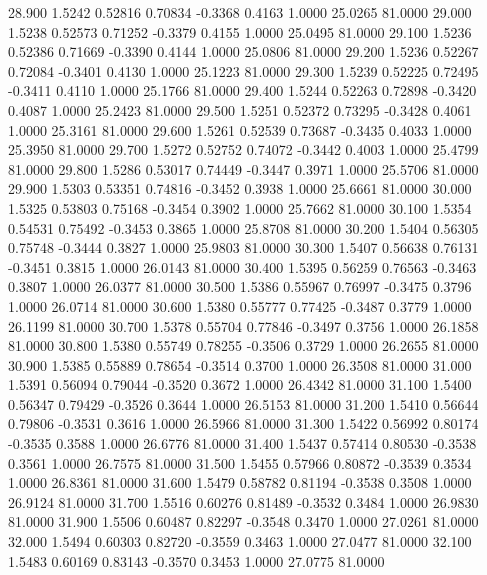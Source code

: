   28.900   1.5242   0.52816   0.70834  -0.3368   0.4163   1.0000  25.0265  81.0000
  29.000   1.5238   0.52573   0.71252  -0.3379   0.4155   1.0000  25.0495  81.0000
  29.100   1.5236   0.52386   0.71669  -0.3390   0.4144   1.0000  25.0806  81.0000
  29.200   1.5236   0.52267   0.72084  -0.3401   0.4130   1.0000  25.1223  81.0000
  29.300   1.5239   0.52225   0.72495  -0.3411   0.4110   1.0000  25.1766  81.0000
  29.400   1.5244   0.52263   0.72898  -0.3420   0.4087   1.0000  25.2423  81.0000
  29.500   1.5251   0.52372   0.73295  -0.3428   0.4061   1.0000  25.3161  81.0000
  29.600   1.5261   0.52539   0.73687  -0.3435   0.4033   1.0000  25.3950  81.0000
  29.700   1.5272   0.52752   0.74072  -0.3442   0.4003   1.0000  25.4799  81.0000
  29.800   1.5286   0.53017   0.74449  -0.3447   0.3971   1.0000  25.5706  81.0000
  29.900   1.5303   0.53351   0.74816  -0.3452   0.3938   1.0000  25.6661  81.0000
  30.000   1.5325   0.53803   0.75168  -0.3454   0.3902   1.0000  25.7662  81.0000
  30.100   1.5354   0.54531   0.75492  -0.3453   0.3865   1.0000  25.8708  81.0000
  30.200   1.5404   0.56305   0.75748  -0.3444   0.3827   1.0000  25.9803  81.0000
  30.300   1.5407   0.56638   0.76131  -0.3451   0.3815   1.0000  26.0143  81.0000
  30.400   1.5395   0.56259   0.76563  -0.3463   0.3807   1.0000  26.0377  81.0000
  30.500   1.5386   0.55967   0.76997  -0.3475   0.3796   1.0000  26.0714  81.0000
  30.600   1.5380   0.55777   0.77425  -0.3487   0.3779   1.0000  26.1199  81.0000
  30.700   1.5378   0.55704   0.77846  -0.3497   0.3756   1.0000  26.1858  81.0000
  30.800   1.5380   0.55749   0.78255  -0.3506   0.3729   1.0000  26.2655  81.0000
  30.900   1.5385   0.55889   0.78654  -0.3514   0.3700   1.0000  26.3508  81.0000
  31.000   1.5391   0.56094   0.79044  -0.3520   0.3672   1.0000  26.4342  81.0000
  31.100   1.5400   0.56347   0.79429  -0.3526   0.3644   1.0000  26.5153  81.0000
  31.200   1.5410   0.56644   0.79806  -0.3531   0.3616   1.0000  26.5966  81.0000
  31.300   1.5422   0.56992   0.80174  -0.3535   0.3588   1.0000  26.6776  81.0000
  31.400   1.5437   0.57414   0.80530  -0.3538   0.3561   1.0000  26.7575  81.0000
  31.500   1.5455   0.57966   0.80872  -0.3539   0.3534   1.0000  26.8361  81.0000
  31.600   1.5479   0.58782   0.81194  -0.3538   0.3508   1.0000  26.9124  81.0000
  31.700   1.5516   0.60276   0.81489  -0.3532   0.3484   1.0000  26.9830  81.0000
  31.900   1.5506   0.60487   0.82297  -0.3548   0.3470   1.0000  27.0261  81.0000
  32.000   1.5494   0.60303   0.82720  -0.3559   0.3463   1.0000  27.0477  81.0000
  32.100   1.5483   0.60169   0.83143  -0.3570   0.3453   1.0000  27.0775  81.0000
